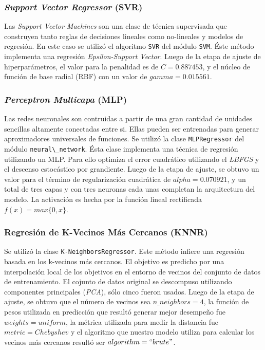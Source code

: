     \subsubsection{\textit{Support Vector Regressor} (SVR)}
      \par Las \textit{Support Vector Machines} son una clase de técnica supervisada
        que construyen tanto reglas de decisiones lineales como no-lineales
        y modelos de regresión. En este caso se utilizó el algoritmo \verb|SVR|
        del módulo \verb|SVM|. Éste método implementa una regresión
        \textit{Epsilon-Support Vector}. Luego de la etapa de ajuste de
        hiperparámetros, el valor para la penalidad es de $C = 0.887453$, y
        el núcleo de función de base radial (RBF) con un valor de
        $gamma = 0.015561$.


    \subsubsection{\textit{Perceptron Multicapa} (MLP)}
      \par Las redes neuronales son contruidas a partir de una gran cantidad
        de unidades sencillas altamente conectadas entre si. Ellas pueden
        ser entrenadas para generar aproximadores universales de funciones.
        Se utilizó la clase \verb|MLPRegressor| del módulo \verb|neural\_network|.
        Ésta clase implementa una técnica de regresión utilizando un MLP. Para
        ello optimiza el error cuadrático utilizando el \textit{LBFGS} y
        el descenso estocástico por grandiente.
        Luego de la etapa de ajuste, se obtuvo un valor para el término
        de regularización cuadrática de $alpha = 0.070921$, y un total de
        tres capas y con tres neuronas cada unas completan la arquitectura
        del modelo. La activación es hecha por la función lineal
        rectificada $f(x) = max\{0, x\}$.


    \subsubsection{Regresión de K-Vecinos Más Cercanos (KNNR)}
      \par Se utilizó la clase \verb|K-NeighborsRegressor|. Este método
        infiere una regresión basada en los k-vecinos más cercanos. El
        objetivo es predicho por una interpolación local de los objetivos
        en el entorno de vecinos del conjunto de datos de entrenamiento.
        El cojunto de datos original se descompuso utilizando componentes
        principales (\textit{PCA}), sólo cinco fueron usados. Luego de la etapa
        de ajuste, se obtuvo que el número de vecinos sea $n\_neighbors = 4$,
        la función de pesos utilizada en predicción que resultó generar mejor
        desempeño fue $weights = uniform$, la métrica utilizada para medir la
        distancia fue $metric = Chebyshev$ y el algoritmo que nuestro modelo
        utiliza para calcular los vecinos más cercanos resultó ser
        $algorithm = ``brute"$.

